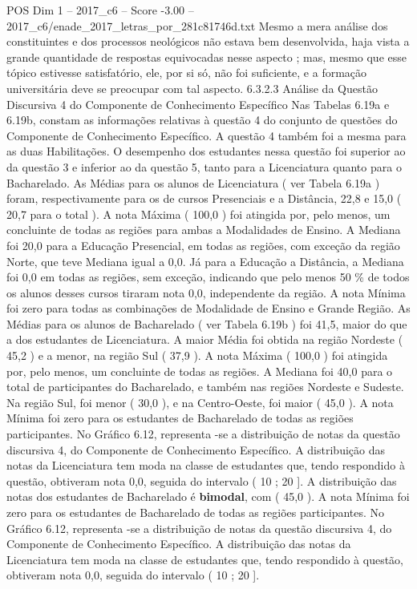 \begin{textsample}{POS Dim 1 – 2017\_c6 – Score -3.00 – 2017\_c6/enade\_2017\_letras\_por\_281c81746d.txt}
Mesmo a mera análise dos constituintes e dos processos neológicos não estava bem desenvolvida, haja vista a grande quantidade de respostas equivocadas nesse aspecto ; mas, mesmo que esse tópico estivesse satisfatório, ele, por si só, não foi suficiente, e a formação universitária deve se preocupar com tal aspecto. 6.3.2.3 Análise da Questão Discursiva 4 do Componente de Conhecimento Específico Nas Tabelas 6.19a e 6.19b, constam as informações relativas à questão 4 do conjunto de questões do Componente de Conhecimento Específico.
A questão 4 também foi a mesma para as duas Habilitações.
O desempenho dos estudantes nessa questão foi superior ao da questão 3 e inferior ao da questão 5, tanto para a Licenciatura quanto para o Bacharelado.
As Médias para os alunos de Licenciatura ( ver Tabela 6.19a ) foram, respectivamente para os de cursos Presenciais e a Distância, 22,8 e 15,0 ( 20,7 para o total ).
A nota Máxima ( 100,0 ) foi atingida por, pelo menos, um concluinte de todas as regiões para ambas a Modalidades de Ensino.
A Mediana foi 20,0 para a Educação Presencial, em todas as regiões, com exceção da região Norte, que teve Mediana igual a 0,0.
Já para a Educação a Distância, a Mediana foi 0,0 em todas as regiões, sem exceção, indicando que pelo menos 50 \% de todos os alunos desses cursos tiraram nota 0,0, independente da região.
A nota Mínima foi zero para todas as combinações de Modalidade de Ensino e Grande Região.
As Médias para os alunos de Bacharelado ( ver Tabela 6.19b ) foi 41,5, maior do que a dos estudantes de Licenciatura.
A maior Média foi obtida na região Nordeste ( 45,2 ) e a menor, na região Sul ( 37,9 ).
A nota Máxima ( 100,0 ) foi atingida por, pelo menos, um concluinte de todas as regiões.
A Mediana foi 40,0 para o total de participantes do Bacharelado, e também nas regiões Nordeste e Sudeste.
Na região Sul, foi menor ( 30,0 ), e na Centro-Oeste, foi maior ( 45,0 ).
A nota Mínima foi zero para os estudantes de Bacharelado de todas as regiões participantes.
No Gráfico 6.12, representa -se a distribuição de notas da questão discursiva 4, do Componente de Conhecimento Específico.
A distribuição das notas da Licenciatura tem moda na classe de estudantes que, tendo respondido à questão, obtiveram nota 0,0, seguida do intervalo ( 10 ; 20 ].
A distribuição das notas dos estudantes de Bacharelado é \textbf{bimodal}, com ( 45,0 ).
A nota Mínima foi zero para os estudantes de Bacharelado de todas as regiões participantes.
No Gráfico 6.12, representa -se a distribuição de notas da questão discursiva 4, do Componente de Conhecimento Específico.
A distribuição das notas da Licenciatura tem moda na classe de estudantes que, tendo respondido à questão, obtiveram nota 0,0, seguida do intervalo ( 10 ; 20 ].

\end{textsample}
